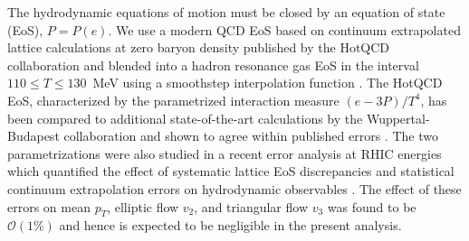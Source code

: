 \documentclass[aps,prc,reprint,amsmath,nofootinbib,noeprint]{revtex4-1}
\begin{document}
The hydrodynamic equations of motion must be closed by an equation of state (EoS), $P = P(e)$.
We use a modern QCD EoS based on continuum extrapolated lattice calculations at zero baryon density published by the HotQCD collaboration \cite{Bazavov:2014pvz} and blended into a hadron resonance gas EoS in the interval {$110 \le T \le 130$~MeV} using a smoothstep interpolation function \cite{Moreland:2015dvc}.
The HotQCD EoS, characterized by the parametrized interaction measure $(e - 3P)/T^4$, has been compared to additional state-of-the-art calculations by the Wuppertal-Budapest collaboration and shown to agree within published errors \cite{Bazavov:2014pvz}.
The two parametrizations were also studied in a recent error analysis at RHIC energies which quantified the effect of systematic lattice EoS discrepancies and statistical continuum extrapolation errors on hydrodynamic observables \cite{Moreland:2015dvc}.
The effect of these errors on mean $p_T$, elliptic flow $v_2$, and triangular flow $v_3$ was found to be $\mathcal O(1\%)$ and hence is expected to be negligible in the present analysis.
\end{document}
